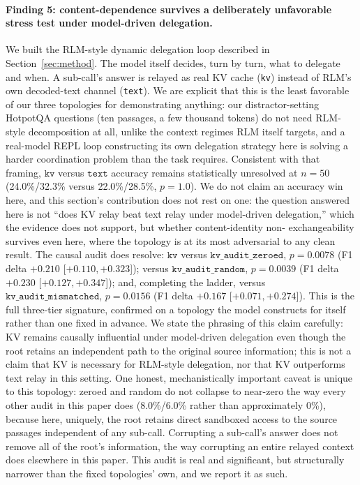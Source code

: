 \documentclass[11pt]{article}
\begin{document}
\paragraph{Finding 5: content-dependence survives a deliberately
unfavorable stress test under model-driven delegation.} We built the
RLM-style dynamic delegation loop described in Section~\ref{sec:method}.
The model itself decides, turn by turn, what to delegate and when. A
sub-call's answer is relayed as real KV cache (\texttt{kv}) instead of
RLM's own decoded-text channel (\texttt{text}). We are explicit that this
is the least favorable of our three topologies for demonstrating
anything: our distractor-setting HotpotQA questions (ten passages, a few
thousand tokens) do not need RLM-style decomposition at all, unlike the
context regimes RLM itself targets, and a real-model REPL loop
constructing its own delegation strategy here is solving a harder
coordination problem than the task requires. Consistent with that
framing, $\texttt{kv}$ versus $\texttt{text}$ accuracy remains
statistically unresolved at $n=50$ (24.0\%/32.3\% versus 22.0\%/28.5\%,
$p=1.0$). We do not claim an accuracy win here, and this section's
contribution does not rest on one: the question answered here is not
``does KV relay beat text relay under model-driven delegation,'' which
the evidence does not support, but whether content-identity non-
exchangeability survives even here, where the topology is at its most
adversarial to any clean result. The causal audit does resolve: $\texttt{kv}$
versus $\texttt{kv\_audit\_zeroed}$, $p=0.0078$ (F1 delta $+0.210$
[$+0.110,+0.323$]); versus $\texttt{kv\_audit\_random}$, $p=0.0039$ (F1
delta $+0.230$ [$+0.127,+0.347$]); and, completing the ladder, versus
$\texttt{kv\_audit\_mismatched}$, $p=0.0156$ (F1 delta $+0.167$
[$+0.071,+0.274$]). This is the full three-tier signature, confirmed on a
topology the model constructs for itself rather than one fixed in
advance. We state the phrasing of this claim carefully: KV remains
causally influential under model-driven delegation even though the root
retains an independent path to the original source information; this is
not a claim that KV is necessary for RLM-style delegation, nor that KV
outperforms text relay in this setting. One honest, mechanistically
important caveat is unique to this topology: zeroed and random do not
collapse to near-zero the way every other audit in this paper does
(8.0\%/6.0\% rather than approximately 0\%), because here, uniquely, the
root retains direct sandboxed access to the source passages independent
of any sub-call. Corrupting a sub-call's answer does not remove all of
the root's information, the way corrupting an entire relayed context does
elsewhere in this paper. This audit is real and significant, but
structurally narrower than the fixed topologies' own, and we report it
as such.
\end{document}
